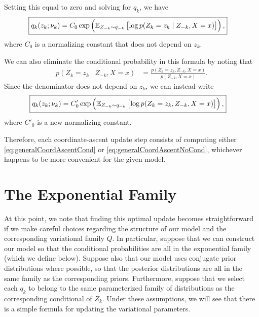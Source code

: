 \documentclass[11pt]{article}
\begin{document}
Setting this equal to zero and solving for $q_k$, we have
\begin{align}
\label{eq:generalCoordAscentCond}
\Aboxed{
q_k(z_k; \nu_k)
&= C_0 \exp \left( \expectOver{Z_{-k} \sim q_{-k}}{ \log p(Z_k = z_k \mid Z_{-k}, X = x) } \right),
}
\end{align}
where $C_0$ is a normalizing constant that does not depend on $z_k$.

We can also eliminate the conditional probability in this formula by noting that
\begin{align}
p(Z_k = z_k \mid Z_{-k}, X = x)
&= \frac{p(Z_k = z_k, Z_{-k}, X = x)}{p(Z_{-k}, X = x)}.
\end{align}
Since the denominator does not depend on $z_k$, we can instead write
\begin{align}
\label{eq:generalCoordAscentNoCond}
\Aboxed{
q_k(z_k; \nu_k)
&= C'_0 \exp \left( \expectOver{Z_{-k} \sim q_{-k}}{ \log p(Z_k = z_k, Z_{-k}, X = x) } \right),
}
\end{align}
where $C'_0$ is a new normalizing constant.

Therefore, each coordinate-ascent update step consists of computing either \eqref{eq:generalCoordAscentCond} or \eqref{eq:generalCoordAscentNoCond}, whichever happens to be more convenient for the given model.

\section{The Exponential Family}

At this point, we note that finding this optimal update becomes straightforward if we make careful choices regarding the structure of our model and the corresponding variational family $Q$.
In particular, suppose that we can construct our model so that the conditional probabilities are all in the exponential family (which we define below).
Suppose also that our model uses conjugate prior distributions where possible, so that the posterior distributions are all in the same family as the corresponding priors.
Furthermore, suppose that we select each $q_k$ to belong to the same parameterized family of distributions as the corresponding conditional of $Z_k$.
Under these assumptions, we will see that there is a simple formula for updating the variational parameters.
\end{document}
